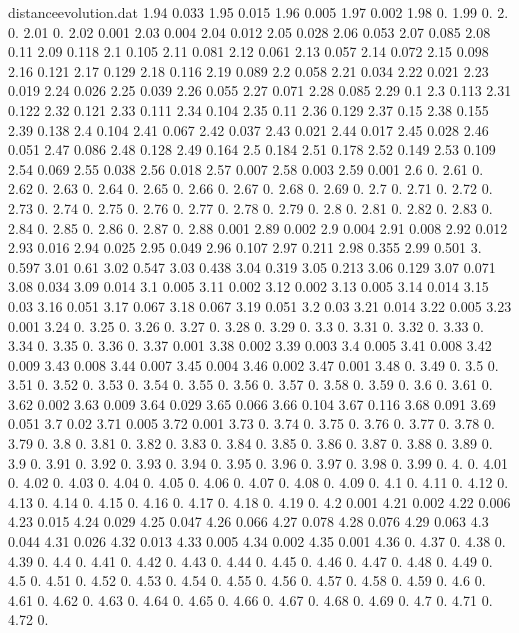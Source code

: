 \documentclass[a4paper,12pt,listof=totoc,index=totoc,bibliography=totoc,headsepline=false,headings=normal,BCOR16.153846mm,DIV12,headinclude,twoside,cleardoublepage=empty,numbers=noenddot,final]{scrreprt}
\theoremstyle{mystyle}
\numberwithin{equation}{section}
\numberwithin{figure}{section}
\numberwithin{lemma}{section}
\numberwithin{theorem}{section}
\numberwithin{corollary}{section}
\numberwithin{definition}{section}
\numberwithin{conjecture}{section}
\numberwithin{observation}{section}
\newcommand{\+}{\mkern2mu}
\DeclareMathOperator{\1}{\mathds{1}}
\begin{document}
\begin{filecontents}{distanceevolution.dat}
1.94	0.033
1.95	0.015
1.96	0.005
1.97	0.002
1.98	0.
1.99	0.
2.	0.
2.01	0.
2.02	0.001
2.03	0.004
2.04	0.012
2.05	0.028
2.06	0.053
2.07	0.085
2.08	0.11
2.09	0.118
2.1	0.105
2.11	0.081
2.12	0.061
2.13	0.057
2.14	0.072
2.15	0.098
2.16	0.121
2.17	0.129
2.18	0.116
2.19	0.089
2.2	0.058
2.21	0.034
2.22	0.021
2.23	0.019
2.24	0.026
2.25	0.039
2.26	0.055
2.27	0.071
2.28	0.085
2.29	0.1
2.3	0.113
2.31	0.122
2.32	0.121
2.33	0.111
2.34	0.104
2.35	0.11
2.36	0.129
2.37	0.15
2.38	0.155
2.39	0.138
2.4	0.104
2.41	0.067
2.42	0.037
2.43	0.021
2.44	0.017
2.45	0.028
2.46	0.051
2.47	0.086
2.48	0.128
2.49	0.164
2.5	0.184
2.51	0.178
2.52	0.149
2.53	0.109
2.54	0.069
2.55	0.038
2.56	0.018
2.57	0.007
2.58	0.003
2.59	0.001
2.6	0.
2.61	0.
2.62	0.
2.63	0.
2.64	0.
2.65	0.
2.66	0.
2.67	0.
2.68	0.
2.69	0.
2.7	0.
2.71	0.
2.72	0.
2.73	0.
2.74	0.
2.75	0.
2.76	0.
2.77	0.
2.78	0.
2.79	0.
2.8	0.
2.81	0.
2.82	0.
2.83	0.
2.84	0.
2.85	0.
2.86	0.
2.87	0.
2.88	0.001
2.89	0.002
2.9	0.004
2.91	0.008
2.92	0.012
2.93	0.016
2.94	0.025
2.95	0.049
2.96	0.107
2.97	0.211
2.98	0.355
2.99	0.501
3.	0.597
3.01	0.61
3.02	0.547
3.03	0.438
3.04	0.319
3.05	0.213
3.06	0.129
3.07	0.071
3.08	0.034
3.09	0.014
3.1	0.005
3.11	0.002
3.12	0.002
3.13	0.005
3.14	0.014
3.15	0.03
3.16	0.051
3.17	0.067
3.18	0.067
3.19	0.051
3.2	0.03
3.21	0.014
3.22	0.005
3.23	0.001
3.24	0.
3.25	0.
3.26	0.
3.27	0.
3.28	0.
3.29	0.
3.3	0.
3.31	0.
3.32	0.
3.33	0.
3.34	0.
3.35	0.
3.36	0.
3.37	0.001
3.38	0.002
3.39	0.003
3.4	0.005
3.41	0.008
3.42	0.009
3.43	0.008
3.44	0.007
3.45	0.004
3.46	0.002
3.47	0.001
3.48	0.
3.49	0.
3.5	0.
3.51	0.
3.52	0.
3.53	0.
3.54	0.
3.55	0.
3.56	0.
3.57	0.
3.58	0.
3.59	0.
3.6	0.
3.61	0.
3.62	0.002
3.63	0.009
3.64	0.029
3.65	0.066
3.66	0.104
3.67	0.116
3.68	0.091
3.69	0.051
3.7	0.02
3.71	0.005
3.72	0.001
3.73	0.
3.74	0.
3.75	0.
3.76	0.
3.77	0.
3.78	0.
3.79	0.
3.8	0.
3.81	0.
3.82	0.
3.83	0.
3.84	0.
3.85	0.
3.86	0.
3.87	0.
3.88	0.
3.89	0.
3.9	0.
3.91	0.
3.92	0.
3.93	0.
3.94	0.
3.95	0.
3.96	0.
3.97	0.
3.98	0.
3.99	0.
4.	0.
4.01	0.
4.02	0.
4.03	0.
4.04	0.
4.05	0.
4.06	0.
4.07	0.
4.08	0.
4.09	0.
4.1	0.
4.11	0.
4.12	0.
4.13	0.
4.14	0.
4.15	0.
4.16	0.
4.17	0.
4.18	0.
4.19	0.
4.2	0.001
4.21	0.002
4.22	0.006
4.23	0.015
4.24	0.029
4.25	0.047
4.26	0.066
4.27	0.078
4.28	0.076
4.29	0.063
4.3	0.044
4.31	0.026
4.32	0.013
4.33	0.005
4.34	0.002
4.35	0.001
4.36	0.
4.37	0.
4.38	0.
4.39	0.
4.4	0.
4.41	0.
4.42	0.
4.43	0.
4.44	0.
4.45	0.
4.46	0.
4.47	0.
4.48	0.
4.49	0.
4.5	0.
4.51	0.
4.52	0.
4.53	0.
4.54	0.
4.55	0.
4.56	0.
4.57	0.
4.58	0.
4.59	0.
4.6	0.
4.61	0.
4.62	0.
4.63	0.
4.64	0.
4.65	0.
4.66	0.
4.67	0.
4.68	0.
4.69	0.
4.7	0.
4.71	0.
4.72	0.

\end{filecontents}
\end{document}
